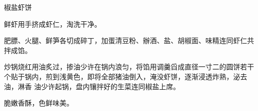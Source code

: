 %
%
%
%
%
%
%
\begin{recipe}{椒盐虾饼}

\ingredients


\preparation

\step 鲜虾用手挤成虾仁，淘洗干净。

\step 肥膘、火腿、鲜笋各切成碎丁，加蛋清豆粉、辦酒、盐、胡椒面、味精连同虾仁共
拌成馅。

\step 炒锅烧红用油炙过，掺油少许在锅内浪匀，将馅用调羹舀成直径一寸二的圆饼若干
个贴于锅内，煎到浅黄色，即将全部猪油倒入，淹没虾饼，逐渐浸透炸熟，泌去油，淋香
油少许起锅，盘内镶拌好的生菜连同椒盐上席。

\features

脆嫩香酥，色鲜味美。

\end{recipe}


